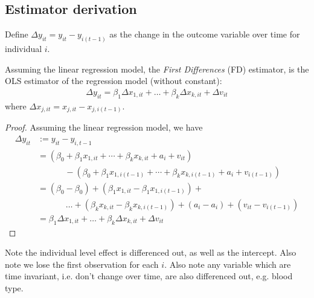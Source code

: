        \subsection{Estimator derivation}
            Define $\Delta y_{it} = y_{it} - y_{i(t-1)}$ as the change in the outcome variable over time for individual $i$.
            \begin{definition}
                Assuming the linear regression model, the \textit{First Differences} (FD) estimator, is the OLS estimator of the regression model (without constant):
    			\begin{align}
    				\Delta y_{it} = \beta_1 \Delta x_{1,it} + \dots +\beta_k \Delta x_{k,it} + \Delta v_{it}
    			\end{align}
    			where $\Delta x_{j,it} = x_{j,it} - x_{j,i(t-1)}$.
    		\end{definition}
    		\begin{proof}
    			Assuming the linear regression model, we have
    			\begin{align*}
    				\Delta y_{it}
    		      		&:=  y_{it} - y_{i,t-1}\\
    					&= \left(\beta_0 +\beta_1 x_{1,it}+\cdots+\beta_k x_{k,it} +a_i +v_{it}\right) \\
    					&\phantom{-}\qquad- \left(\beta_0 +\beta_1 x_{1,i(t-1)}+ \cdots +\beta_k x_{k,i(t-1)} +a_i +v_{i(t-1)}\right)\\
    					&= 
    					(\beta_0-\beta_0 ) + (\beta_1x_{1,it}-\beta_1x_{1,i(t-1)} ) +\\
    					&\phantom{=}\qquad\dots+ (\beta_k x_{k,it}-\beta_k x_{k,i(t-1)} ) +(a_i-a_i)+(v_{it}-v_{i(t-1)}) \\
    					&= \beta_1 \Delta x_{1,it} + \dots +\beta_k \Delta x_{k,it} + \Delta v_{it}
                \end{align*}
            \end{proof}
            
            Note the individual level effect is differenced out, as well as the intercept. Also note we lose the first observation for each $i$. Also note any variable which are time invariant, i.e. don’t change over time, are also differenced out, e.g. blood type.
            
